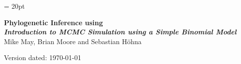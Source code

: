 \documentclass[11pt]{article}
\begin{document}
\renewcommand{\headrulewidth}{0.5pt}
\headsep = 20pt
\lhead{ }

\thispagestyle{plain}
\begin{center}

\textbf{\LARGE Phylogenetic Inference using \RevBayes}\\\vspace{2mm}
\textbf{\it{\Large Introduction to MCMC Simulation using a Simple Binomial Model}}\\\vspace{2mm}
\vspace{1cm}
{\Large Mike May, Brian Moore and Sebastian H{\"o}hna}
\vspace{1cm}
\end{center}

\def \ResourcePath {./}
\def \GlobalResourcePath {../}

\newpage


Version dated: \today
\end{document}
